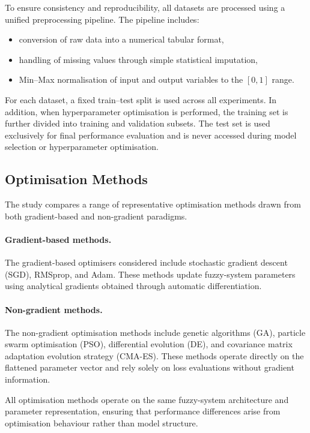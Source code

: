 \documentclass[a4paper,12pt,oneside]{article}
\begin{document}
To ensure consistency and reproducibility, all datasets are processed using a unified preprocessing pipeline. The pipeline includes:
\begin{itemize}
    \item conversion of raw data into a numerical tabular format,
    \item handling of missing values through simple statistical imputation,
    \item Min--Max normalisation of input and output variables to the $[0,1]$ range.
\end{itemize}

For each dataset, a fixed train--test split is used across all experiments. In addition, when hyperparameter optimisation is performed, the training set is further divided into training and validation subsets. The test set is used exclusively for final performance evaluation and is never accessed during model selection or hyperparameter optimisation.

\subsection{Optimisation Methods}

The study compares a range of representative optimisation methods drawn from both gradient-based and non-gradient paradigms.

\paragraph{Gradient-based methods.}
The gradient-based optimisers considered include stochastic gradient descent (SGD), RMSprop, and Adam. These methods update fuzzy-system parameters using analytical gradients obtained through automatic differentiation.

\paragraph{Non-gradient methods.}
The non-gradient optimisation methods include genetic algorithms (GA), particle swarm optimisation (PSO), differential evolution (DE), and covariance matrix adaptation evolution strategy (CMA-ES). These methods operate directly on the flattened parameter vector and rely solely on loss evaluations without gradient information.

All optimisation methods operate on the same fuzzy-system architecture and parameter representation, ensuring that performance differences arise from optimisation behaviour rather than model structure.
\end{document}

